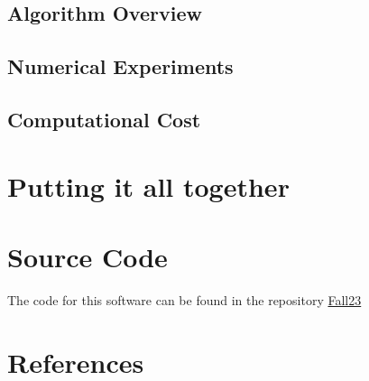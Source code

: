 \documentclass[12pt]{article}
\begin{document}
    \subsection{Algorithm Overview}
    \subsection{Numerical Experiments}
    \subsection{Computational Cost}
    \section{Putting it all together}
    \section{Source Code}
    The code for this software can be found in the repository \href{https://github.com/jprhyne/Fall23}{Fall23}
    \section{References}
    
    
\end{document}
